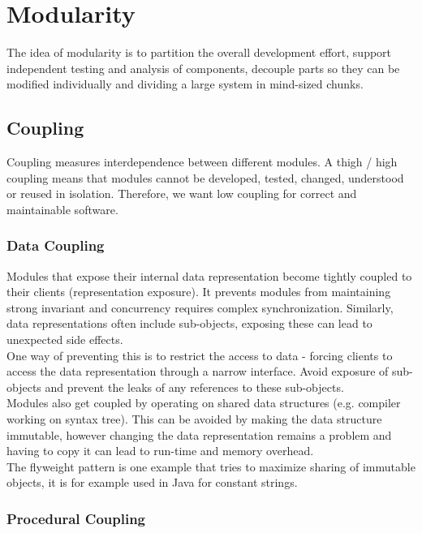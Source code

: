 \section{Modularity}

The idea of modularity is to partition the overall development effort, support independent testing and analysis of components, decouple parts so they can be modified individually and dividing a large system in mind-sized chunks.


\subsection{Coupling}

Coupling measures interdependence between different modules. A thigh / high coupling means that modules cannot be developed, tested, changed, understood or reused in isolation. Therefore, we want low coupling for correct and maintainable software.

\subsubsection{Data Coupling}

Modules that expose their internal data representation become tightly coupled to their clients (representation exposure). It prevents modules from maintaining strong invariant and concurrency requires complex synchronization. Similarly, data representations often include sub-objects, exposing these can lead to unexpected side effects. \\

One way of preventing this is to restrict the access to data - forcing clients to access the data representation through a narrow interface. Avoid exposure of sub-objects and prevent the leaks of any references to these sub-objects. \\

Modules also get coupled by operating on shared data structures (e.g. compiler working on syntax tree). This can be avoided by making the data structure immutable, however changing the data representation remains a problem and having to copy it can lead to run-time and memory overhead. \\

The flyweight pattern is one example that tries to maximize sharing of immutable objects, it is for example used in Java for constant strings.

\subsubsection{Procedural Coupling}

